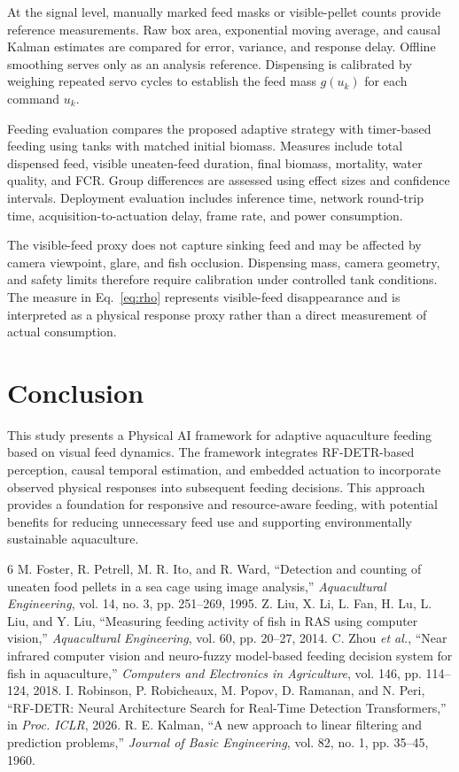 \documentclass[10pt,conference,letterpaper]{IEEEtran}
\begin{document}
At the signal level, manually marked feed masks or visible-pellet counts provide reference measurements. Raw box area, exponential moving average, and causal Kalman estimates are compared for error, variance, and response delay. Offline smoothing serves only as an analysis reference. Dispensing is calibrated by weighing repeated servo cycles to establish the feed mass $g(u_k)$ for each command $u_k$.

Feeding evaluation compares the proposed adaptive strategy with timer-based feeding using tanks with matched initial biomass. Measures include total dispensed feed, visible uneaten-feed duration, final biomass, mortality, water quality, and FCR. Group differences are assessed using effect sizes and confidence intervals. Deployment evaluation includes inference time, network round-trip time, acquisition-to-actuation delay, frame rate, and power consumption.

The visible-feed proxy does not capture sinking feed and may be affected by camera viewpoint, glare, and fish occlusion. Dispensing mass, camera geometry, and safety limits therefore require calibration under controlled tank conditions. The measure in Eq.~\eqref{eq:rho} represents visible-feed disappearance and is interpreted as a physical response proxy rather than a direct measurement of actual consumption.

\section{Conclusion}
This study presents a Physical AI framework for adaptive aquaculture feeding based on visual feed dynamics. The framework integrates RF-DETR-based perception, causal temporal estimation, and embedded actuation to incorporate observed physical responses into subsequent feeding decisions. This approach provides a foundation for responsive and resource-aware feeding, with potential benefits for reducing unnecessary feed use and supporting environmentally sustainable aquaculture.

\begin{thebibliography}{6}
 M. Foster, R. Petrell, M. R. Ito, and R. Ward, ``Detection and counting of uneaten food pellets in a sea cage using image analysis,'' \emph{Aquacultural Engineering}, vol. 14, no. 3, pp. 251--269, 1995.
 Z. Liu, X. Li, L. Fan, H. Lu, L. Liu, and Y. Liu, ``Measuring feeding activity of fish in RAS using computer vision,'' \emph{Aquacultural Engineering}, vol. 60, pp. 20--27, 2014.
 C. Zhou \emph{et al.}, ``Near infrared computer vision and neuro-fuzzy model-based feeding decision system for fish in aquaculture,'' \emph{Computers and Electronics in Agriculture}, vol. 146, pp. 114--124, 2018.
 I. Robinson, P. Robicheaux, M. Popov, D. Ramanan, and N. Peri, ``RF-DETR: Neural Architecture Search for Real-Time Detection Transformers,'' in \emph{Proc. ICLR}, 2026.
 R. E. Kalman, ``A new approach to linear filtering and prediction problems,'' \emph{Journal of Basic Engineering}, vol. 82, no. 1, pp. 35--45, 1960.
\end{thebibliography}
\end{document}
